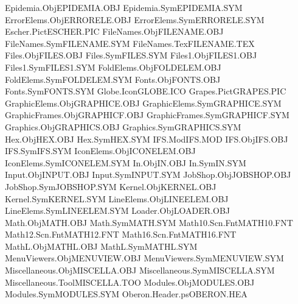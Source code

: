 Epidemia.Obj                    EPIDEMIA.OBJ 
Epidemia.Sym                    EPIDEMIA.SYM 
ErrorElems.Obj                  ERRORELE.OBJ 
ErrorElems.Sym                  ERRORELE.SYM 
Escher.Pict                     ESCHER.PIC   
FileNames.Obj                   FILENAME.OBJ 
FileNames.Sym                   FILENAME.SYM 
FileNames.Tex                   FILENAME.TEX 
Files.Obj                       FILES.OBJ    
Files.Sym                       FILES.SYM    
Files1.Obj                      FILES1.OBJ   
Files1.Sym                      FILES1.SYM   
FoldElems.Obj                   FOLDELEM.OBJ 
FoldElems.Sym                   FOLDELEM.SYM 
Fonts.Obj                       FONTS.OBJ    
Fonts.Sym                       FONTS.SYM    
Globe.Icon                      GLOBE.ICO    
Grapes.Pict                     GRAPES.PIC   
GraphicElems.Obj                GRAPHICE.OBJ 
GraphicElems.Sym                GRAPHICE.SYM 
GraphicFrames.Obj               GRAPHICF.OBJ 
GraphicFrames.Sym               GRAPHICF.SYM 
Graphics.Obj                    GRAPHICS.OBJ 
Graphics.Sym                    GRAPHICS.SYM 
Hex.Obj                         HEX.OBJ      
Hex.Sym                         HEX.SYM      
IFS.Mod                         IFS.MOD      
IFS.Obj                         IFS.OBJ      
IFS.Sym                         IFS.SYM      
IconElems.Obj                   ICONELEM.OBJ 
IconElems.Sym                   ICONELEM.SYM 
In.Obj                          IN.OBJ       
In.Sym                          IN.SYM       
Input.Obj                       INPUT.OBJ    
Input.Sym                       INPUT.SYM    
JobShop.Obj                     JOBSHOP.OBJ  
JobShop.Sym                     JOBSHOP.SYM  
Kernel.Obj                      KERNEL.OBJ   
Kernel.Sym                      KERNEL.SYM   
LineElems.Obj                   LINEELEM.OBJ 
LineElems.Sym                   LINEELEM.SYM 
Loader.Obj                      LOADER.OBJ   
Math.Obj                        MATH.OBJ     
Math.Sym                        MATH.SYM     
Math10.Scn.Fnt                  MATH10.FNT   
Math12.Scn.Fnt                  MATH12.FNT   
Math16.Scn.Fnt                  MATH16.FNT   
MathL.Obj                       MATHL.OBJ    
MathL.Sym                       MATHL.SYM    
MenuViewers.Obj                 MENUVIEW.OBJ 
MenuViewers.Sym                 MENUVIEW.SYM 
Miscellaneous.Obj               MISCELLA.OBJ 
Miscellaneous.Sym               MISCELLA.SYM 
Miscellaneous.Tool              MISCELLA.TOO 
Modules.Obj                     MODULES.OBJ  
Modules.Sym                     MODULES.SYM  
Oberon.Header.ps                OBERON.HEA   
